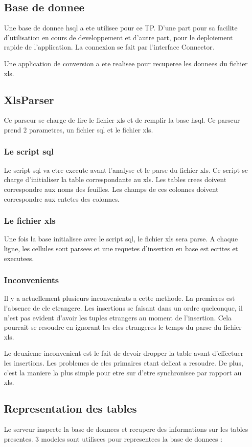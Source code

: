 \subsection{Base de donnee}
Une base de donnee hsql a ete utilisee pour ce TP. D'une part pour sa facilite d'utilisation en cours de developpement et d'autre part, pour le deploiement rapide de l'application. La connexion se fait par l'interface Connector.

Une application de conversion a ete realisee pour recuperee les donnees du fichier xls.
\subsection{XlsParser}
Ce parseur se charge de lire le fichier xls et de remplir la base hsql. Ce parseur prend 2 parametres, un fichier sql et le fichier xls.
\subsubsection{Le script sql}
Le script sql va etre execute avant l'analyse et le parse du fichier xls. Ce script se charge d'initialiser la table correspondante au xls. Les tables crees doivent correspondre aux noms des feuilles. Les champs de ces colonnes doivent correspondre aux entetes des colonnes.
\subsubsection{Le fichier xls}
Une fois la base initialisee avec le script sql, le fichier xls sera parse. A chaque ligne, les cellules sont parsees et une requetes d'insertion en base est ecrites et executees.
\subsubsection{Inconvenients}
Il y a actuellement plusieurs inconvenients a cette methode. La premieres est l'absence de cle etrangere. Les insertions se faisant dans un ordre quelconque, il n'est pas evident d'avoir les tuples etrangers au moment de l'insertion. Cela pourrait se resoudre en ignorant les cles etrangeres le temps du parse du fichier xls.

Le deuxieme inconvenient est le fait de devoir dropper la table avant d'effectuer les insertions. Les problemes de cles primaires etant delicat a resoudre. De plus, c'est la maniere la plus simple pour etre sur d'etre synchronisee par rapport au xls.
\subsection{Representation des tables}
Le serveur inspecte la base de donnees et recupere des informations sur les tables presentes. 3 modeles sont utilisees pour representees la base de donnees :
